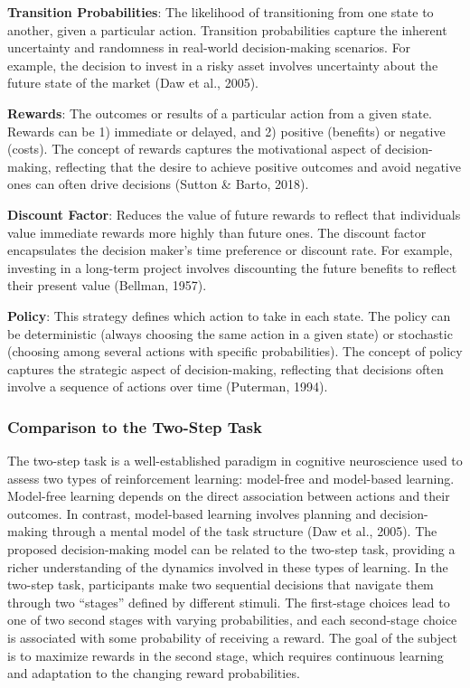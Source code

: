 \documentclass[
]{article}
\begin{document}
\textbf{Transition Probabilities}: The likelihood of transitioning from
one state to another, given a particular action. Transition
probabilities capture the inherent uncertainty and randomness in
real-world decision-making scenarios. For example, the decision to
invest in a risky asset involves uncertainty about the future state of
the market (Daw et al., 2005).

\textbf{Rewards}: The outcomes or results of a particular action from a
given state. Rewards can be 1) immediate or delayed, and 2) positive
(benefits) or negative (costs). The concept of rewards captures the
motivational aspect of decision-making, reflecting that the desire to
achieve positive outcomes and avoid negative ones can often drive
decisions (Sutton \& Barto, 2018).

\textbf{Discount Factor}: Reduces the value of future rewards to reflect
that individuals value immediate rewards more highly than future ones.
The discount factor encapsulates the decision maker's time preference or
discount rate. For example, investing in a long-term project involves
discounting the future benefits to reflect their present value (Bellman,
1957).

\textbf{Policy}: This strategy defines which action to take in each
state. The policy can be deterministic (always choosing the same action
in a given state) or stochastic (choosing among several actions with
specific probabilities). The concept of policy captures the strategic
aspect of decision-making, reflecting that decisions often involve a
sequence of actions over time (Puterman, 1994).

\hypertarget{comparison-to-the-two-step-task}{%
\subsubsection{Comparison to the Two-Step
Task}\label{comparison-to-the-two-step-task}}

The two-step task is a well-established paradigm in cognitive
neuroscience used to assess two types of reinforcement learning:
model-free and model-based learning. Model-free learning depends on the
direct association between actions and their outcomes. In contrast,
model-based learning involves planning and decision-making through a
mental model of the task structure (Daw et al., 2005). The proposed
decision-making model can be related to the two-step task, providing a
richer understanding of the dynamics involved in these types of
learning. In the two-step task, participants make two sequential
decisions that navigate them through two ``stages'' defined by different
stimuli. The first-stage choices lead to one of two second stages with
varying probabilities, and each second-stage choice is associated with
some probability of receiving a reward. The goal of the subject is to
maximize rewards in the second stage, which requires continuous learning
and adaptation to the changing reward probabilities.
\end{document}
